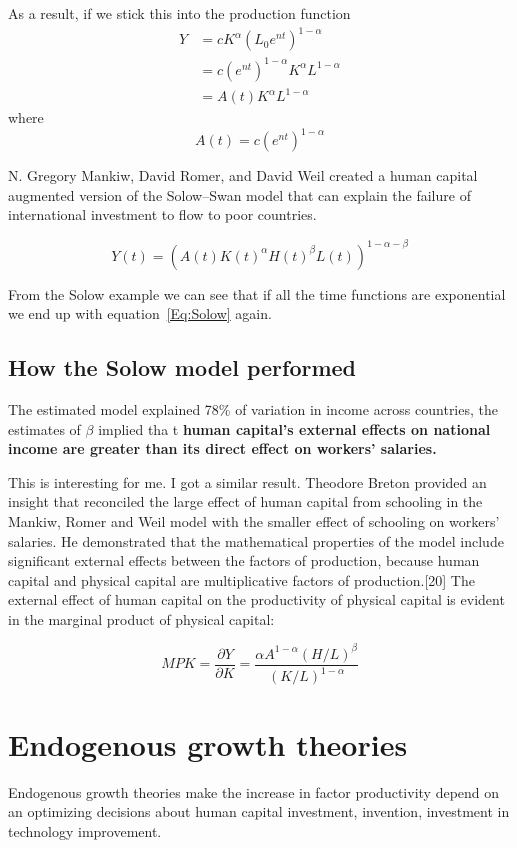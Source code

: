   
 As a result, if we stick this into the production function 
 \begin{eqnarray}
 Y&=cK^\alpha (L_0e^{nt})^{1-\alpha}\\
    &=c(e^{nt})^{1-\alpha}K^\alpha L^{1-\alpha}\\
    &=A(t)K^\alpha L^{1-\alpha} \label{Eq:Solow}
 \end{eqnarray}
 where
 \[A(t)=c(e^{nt})^{1-\alpha}\]
 
 N. Gregory Mankiw, David Romer, and David Weil created a human capital augmented version of the Solow–Swan model that can explain the failure of international investment to flow to poor countries.

    \[Y(t)=(A(t)K(t)^\alpha H(t)^\beta L(t))^{1-\alpha -\beta} \]
    
    From the Solow example we can see that if all the time functions are exponential we end up with equation~\ref{Eq:Solow} again.
    
\subsection{How the Solow model performed}    
The estimated model explained 78\% of variation in income across countries, the estimates of $\beta$ implied tha t\textbf{ human capital's external effects on national income are greater than its direct effect on workers' salaries.}%
    
This is interesting for me. I got a similar result. Theodore Breton provided an insight that reconciled the large effect of human capital from schooling in the Mankiw, Romer and Weil model with the smaller effect of schooling on workers' salaries. He demonstrated that the mathematical properties of the model include significant external effects between the factors of production, because human capital and physical capital are multiplicative factors of production.[20] The external effect of human capital on the productivity of physical capital is evident in the marginal product of physical capital:

    \[ MPK={\frac {\partial Y}{\partial K}}=\frac {\alpha A^{1-\alpha }(H/L)^{\beta }}{(K/L)^{1-\alpha} }\]
 
 \section{Endogenous growth theories}  
Endogenous growth theories make the increase in factor productivity depend on an optimizing decisions about human capital investment, invention, investment in technology improvement.  
 
